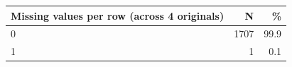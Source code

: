\begin{threeparttable}


\begin{tabular}{@{}lrr@{}}


\toprule


\textbf{Missing values per row (across 4 originals)} & \textbf{N} & \textbf{\%} \\


\midrule


\midrule
0           &        1707&        99.9\\
1           &           1&         0.1\\
\bottomrule


\end{tabular}


\end{threeparttable}
